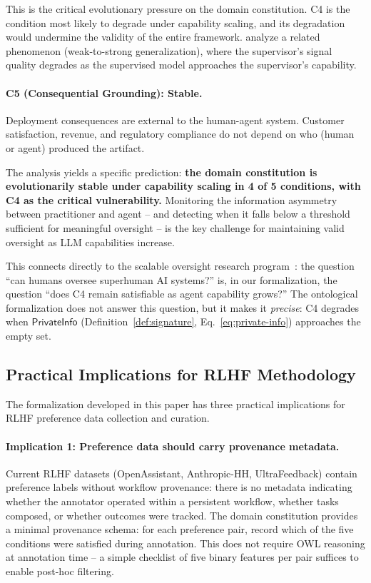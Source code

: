 \documentclass[11pt]{article}
\begin{document}
This is the critical evolutionary pressure on the domain constitution.
C4 is the condition most likely to degrade under capability scaling, and its degradation would undermine the validity of the entire framework.
\citet{burns2023weak} analyze a related phenomenon (weak-to-strong generalization), where the supervisor's signal quality degrades as the supervised model approaches the supervisor's capability.

\paragraph{C5 (Consequential Grounding): Stable.}
Deployment consequences are external to the human-agent system.
Customer satisfaction, revenue, and regulatory compliance do not depend on who (human or agent) produced the artifact.

The analysis yields a specific prediction: \textbf{the domain constitution is evolutionarily stable under capability scaling in 4 of 5 conditions, with C4 as the critical vulnerability.}
Monitoring the information asymmetry between practitioner and agent -- and detecting when it falls below a threshold sufficient for meaningful oversight -- is the key challenge for maintaining valid oversight as LLM capabilities increase.

This connects directly to the scalable oversight research program~\citep{bowman2022measuring}: the question ``can humans oversee superhuman AI systems?'' is, in our formalization, the question ``does C4 remain satisfiable as agent capability grows?''
The ontological formalization does not answer this question, but it makes it \emph{precise}: C4 degrades when $\mathsf{PrivateInfo}$ (Definition~\ref{def:signature}, Eq.~\ref{eq:private-info}) approaches the empty set.

\subsection{Practical Implications for RLHF Methodology}
\label{sec:disc-practical}

The formalization developed in this paper has three practical implications for RLHF preference data collection and curation.

\paragraph{Implication 1: Preference data should carry provenance metadata.}
Current RLHF datasets (OpenAssistant, Anthropic-HH, UltraFeedback) contain preference labels without workflow provenance: there is no metadata indicating whether the annotator operated within a persistent workflow, whether tasks composed, or whether outcomes were tracked.
The domain constitution provides a minimal provenance schema: for each preference pair, record which of the five conditions were satisfied during annotation.
This does not require OWL reasoning at annotation time -- a simple checklist of five binary features per pair suffices to enable post-hoc filtering.
\end{document}

